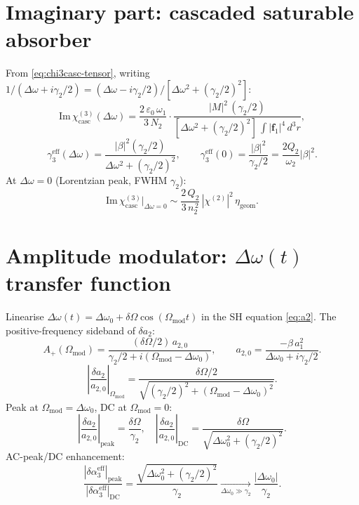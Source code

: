 \documentclass[11pt,a4paper]{article}
\newcommand{\eps}{\varepsilon}
\newcommand{\bvec}[1]{\mathbf{#1}}
\newcommand{\f}{\bvec{f}}
\newcommand{\dthreer}{\,d^{3}r}
\newcommand{\chitwo}{\chi^{(2)}}
\newcommand{\chithree}{\chi^{(3)}}
\newcommand{\Dom}{\Delta\omega}
\begin{document}
\section{Imaginary part: cascaded saturable absorber}

From \eqref{eq:chi3casc-tensor}, writing $1/(\Dom+i\gamma_2/2)=(\Dom-i\gamma_2/2)/[\Dom^2+(\gamma_2/2)^2]$:
\begin{equation}
  \mathrm{Im}\,\chithree_\text{casc}(\Dom)
   =\frac{2\,\eps_0\,\omega_1}{3\,N_2}\cdot
        \frac{|M|^{2}\,(\gamma_2/2)}{[\Dom^{2}+(\gamma_2/2)^{2}]\,\int|\f_1|^{4}\dthreer},
\end{equation}
\begin{equation}
  \gamma_3^\text{eff}(\Dom)=\frac{|\beta|^{2}(\gamma_2/2)}{\Dom^{2}+(\gamma_2/2)^{2}},
  \qquad
  \gamma_3^\text{eff}(0)=\frac{|\beta|^{2}}{\gamma_2/2}=\frac{2 Q_2}{\omega_2}|\beta|^{2}.
\end{equation}
At $\Dom=0$ (Lorentzian peak, FWHM $\gamma_2$):
\begin{equation}
  \mathrm{Im}\,\chithree_\text{casc}\big|_{\Dom=0}
       \sim\frac{2\,Q_2}{3\,n_2^{\,2}}\,|\chitwo|^{2}\,\eta_\text{geom}.
\end{equation}

\section{Amplitude modulator: $\Dom(t)$ transfer function}

Linearise $\Dom(t)=\Dom_0+\delta\Omega\cos(\Omega_\text{mod}t)$ in the SH equation \eqref{eq:a2}. The positive-frequency sideband of $\delta a_2$:
\begin{equation}
  A_+(\Omega_\text{mod})=\frac{(\delta\Omega/2)\,a_{2,0}}{\gamma_2/2+i(\Omega_\text{mod}-\Dom_0)},
  \qquad a_{2,0}=\frac{-\beta\,a_1^{2}}{\Dom_0+i\gamma_2/2}.
\end{equation}
\begin{equation}
  \left|\frac{\delta a_2}{a_{2,0}}\right|_{\Omega_\text{mod}}
   =\frac{\delta\Omega/2}{\sqrt{(\gamma_2/2)^{2}+(\Omega_\text{mod}-\Dom_0)^{2}}}.
\end{equation}
Peak at $\Omega_\text{mod}=\Dom_0$, DC at $\Omega_\text{mod}=0$:
\begin{equation}
  \left|\frac{\delta a_2}{a_{2,0}}\right|_\text{peak}=\frac{\delta\Omega}{\gamma_2},
  \quad
  \left|\frac{\delta a_2}{a_{2,0}}\right|_\text{DC}=\frac{\delta\Omega}{\sqrt{\Dom_0^{2}+(\gamma_2/2)^{2}}}.
\end{equation}
AC-peak/DC enhancement:
\begin{equation}
  \boxed{\;
  \frac{|\delta\alpha_3^\text{eff}|_\text{peak}}{|\delta\alpha_3^\text{eff}|_\text{DC}}
  =\frac{\sqrt{\Dom_0^{2}+(\gamma_2/2)^{2}}}{\gamma_2}
  \xrightarrow[\Dom_0\gg\gamma_2]{}\frac{|\Dom_0|}{\gamma_2}.\;}
  \label{eq:AC-peak-enhancement}
\end{equation}
\end{document}
